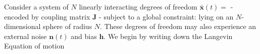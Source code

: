 Consider a system of $N$ linearly interacting degrees of freedom $\mathbf{\bar x}(t) = $ - encoded by coupling matrix $\mathbf{J}$ - subject to a global constraint: lying on an $N$-dimensional sphere of radius $N$. These degrees of freedom may also experience an external noise $\mathbf{n}(t)$ and bias $\mathbf{h}$. We begin by writing down the Langevin Equation of motion